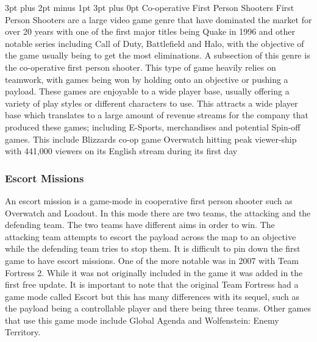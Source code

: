 \documentclass[12pt,a4paper,oneside]{book}
\makeatletter
\renewcommand\subsection{\@startsection {subsection}{1}{2mm} %
                               {3pt plus 2pt minus 1pt} %
                               {3pt plus 0pt} %
                               {\normalfont\bfseries}}
\makeatother
\begin{document}
\subsection{Co-operative First Person Shooters}
First Person Shooters are a large video game genre that have dominated the market for over 20 years with one of the first major titles being Quake in 1996 and other notable series including Call of Duty, Battlefield and Halo, with the objective of the game usually being to get the most eliminations. 
\vspace{5mm} 
\newline
A subsection of this genre is the co-operative first person shooter. This type of game heavily relies on teamwork, with games being won by holding onto an objective or pushing a payload. These games are enjoyable to a wide player base, usually offering a variety of play styles or different characters to use. This attracts a wide player base which translates to a large amount of revenue streams for the company that produced these games; including E-Sports, merchandises and potential Spin-off games. This include Blizzards co-op game Overwatch hitting peak viewer-ship with 441,000 viewers on its English stream during its first day \cite{LukeChristou}
\subsubsection{Escort Missions}
An escort mission is a game-mode in cooperative first person shooter such as Overwatch and Loadout. In this mode there are two teams, the attacking and the defending team. The two teams have different aims in order to win. The attacking team attempts to escort the payload across the map to an objective while the defending team tries to stop them. It is difficult to pin down the first game to have escort missions. One of the more notable was in 2007 with Team Fortress 2. While it was not originally included in the game it was added in the first free update. It is important to note that the original Team Fortress had a game mode called Escort but this has many differences with its sequel, such as the payload being a controllable player and there being three teams. Other games that use this game mode include Global Agenda and Wolfenstein: Enemy Territory.    
\vspace{5mm} 
\newline
\end{document}
